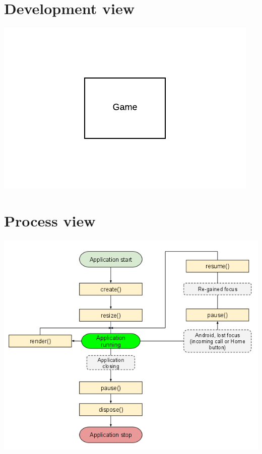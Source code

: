 \documentclass{article}
\begin{document}
\section{Development view}
\begin{center}
    \includegraphics[scale=0.5]{developmentview.png}
\end{center}

\section{Process view}
\begin{center}
    \includegraphics[scale=0.5]{lifecycle.png}
\end{center}
\end{document}
